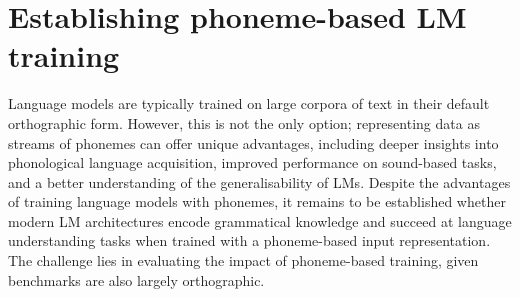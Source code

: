 \chapter{Establishing phoneme-based LM training}\label{chapter:modelling}

Language models are typically trained on large corpora of text in their default orthographic form. However, this is not the only option; representing data as streams of phonemes can offer unique advantages, including deeper insights into phonological language acquisition, improved performance on sound-based tasks, and a better understanding of the generalisability of LMs. Despite the advantages of training language models with phonemes, it remains to be established whether modern LM architectures encode grammatical knowledge and succeed at language understanding tasks when trained with a phoneme-based input representation. The challenge lies in evaluating the impact of phoneme-based training, given benchmarks are also largely orthographic. 



